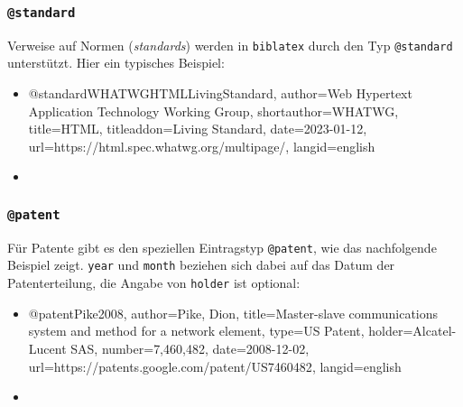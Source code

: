 
\subsubsection{\texttt{\bfseries @standard}}
\label{sec:@standard}


Verweise auf Normen (\emph{standards}) werden in \texttt{biblatex} durch den
Typ \texttt{@standard} unterstützt. Hier ein typisches Beispiel:
%
\begin{itemize}
\item[]
\begin{GenericCode}[numbers=none]
@standard{WHATWGHTMLLivingStandard,
  author={{Web Hypertext Application Technology Working Group}},
  shortauthor={WHATWG},
  title={HTML},
  titleaddon={Living Standard},
  date={2023-01-12},
  url={https://html.spec.whatwg.org/multipage/},
  langid={english}
}
\end{GenericCode}
\item[\cite{WHATWGHTMLLivingStandard}] 
\end{itemize}
%


\subsubsection{\texttt{\bfseries @patent}}
\label{sec:@patent}

Für Patente gibt es den speziellen Eintragstyp \texttt{@patent}, wie das
nachfolgende Beispiel zeigt. \texttt{year} und \texttt{month} beziehen sich
dabei auf das Datum der Patenterteilung, die Angabe von \texttt{holder} ist
optional:
%
\begin{itemize}
\item[]
\begin{GenericCode}[numbers=none]
@patent{Pike2008,
  author={Pike, Dion},
  title={Master-slave communications system and method for a network element},
  type={US Patent},
  holder={Alcatel-Lucent SAS},
  number={7,460,482},
  date={2008-12-02},
  url={https://patents.google.com/patent/US7460482},
  langid={english}
}
\end{GenericCode}
\item[\cite{Pike2008}] 
\end{itemize}
%


